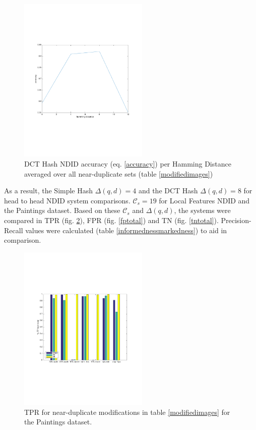 \documentclass[english,12pt,a4paper,pdftex,elec,utf8, table]{aaltothesis}
\begin{document}
\begin{figure}[htb]
\begin{center}
\includegraphics[height=8cm]{figures/dctTotalAccuracy}
\end{center}
\caption{DCT Hash NDID accuracy (eq. \ref{accuracy}) per Hamming Distance averaged over all near-duplicate sets (table \ref{modifiedimages})}
\label{dcttotalaccuracy}
\end{figure}

As a result, the Simple Hash $\Delta(q,d)=4$ and the DCT Hash $\Delta(q,d)=8$ for head to head NDID system comparisons. $\mathcal{C}_s=19$ for Local Features NDID and the Paintings dataset. Based on these $\mathcal{C}_s$ and $\Delta(q,d)$, the systems were compared in TPR (fig. \ref{tptotal}), FPR (fig. \ref{fptotal}) and TN (fig. \ref{tntotal}). Precision-Recall values were calculated (table \ref{informednessmarkedness}) to aid in comparison.

\begin{figure}[htb]
\begin{center}
\includegraphics[height=8cm]{figures/tpBar}
\end{center}
\caption{ TPR for near-duplicate modifications in table \ref{modifiedimages} for the Paintings dataset.}
\label{tptotal}
\end{figure}
\end{document}
